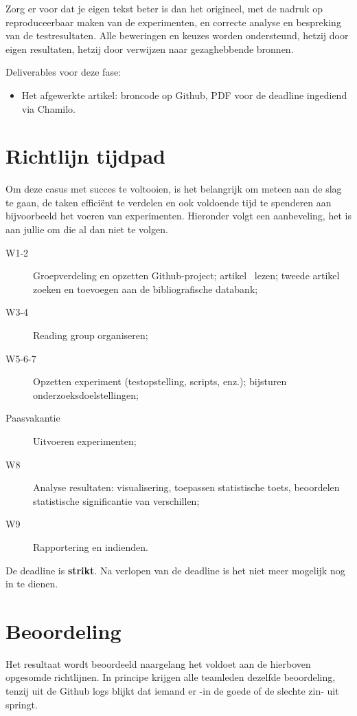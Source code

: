 \documentclass[fleqn,10pt]{voorstel}
\begin{document}
Zorg er voor dat je eigen tekst beter is dan het origineel, met de nadruk op reproduceerbaar maken van de experimenten, en correcte analyse en bespreking van de testresultaten. Alle beweringen en keuzes worden ondersteund, hetzij door eigen resultaten, hetzij door verwijzen naar gezaghebbende bronnen.

Deliverables voor deze fase:

\begin{itemize}
  \item Het afgewerkte artikel: broncode op Github, PDF voor de deadline ingediend via Chamilo.
\end{itemize}

\section{Richtlijn tijdpad}

Om deze casus met succes te voltooien, is het belangrijk om meteen aan de slag te gaan, de taken efficiënt te verdelen en ook voldoende tijd te spenderen aan bijvoorbeeld het voeren van experimenten. Hieronder volgt een aanbeveling, het is aan jullie om die al dan niet te volgen.

\begin{description}
	\item[W1-2] Groepverdeling en opzetten Github-project; artikel~\textcite{Bassil2012} lezen; tweede artikel zoeken en toevoegen aan de bibliografische databank;
	\item[W3-4] Reading group organiseren;
	\item[W5-6-7] Opzetten experiment (testopstelling, scripts, enz.); bijsturen onderzoeksdoelstellingen;
	\item[Paasvakantie] Uitvoeren experimenten;
	\item[W8] Analyse resultaten: visualisering, toepassen statistische toets, beoordelen statistische significantie van verschillen;
	\item[W9] Rapportering en indienden.
\end{description}

De deadline is \textbf{strikt}. Na verlopen van de deadline is het niet meer mogelijk nog in te dienen.

\section{Beoordeling}

Het resultaat wordt beoordeeld naargelang het voldoet aan de hierboven opgesomde richtlijnen. In principe krijgen alle teamleden dezelfde beoordeling, tenzij uit de Github logs blijkt dat iemand er -in de goede of de slechte zin- uit springt.
\end{document}

